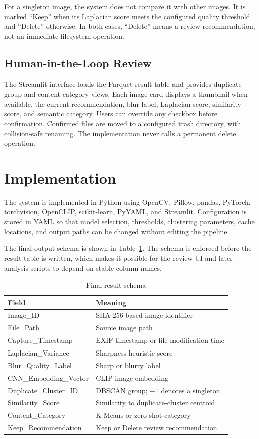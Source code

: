 \documentclass[conference]{IEEEtran}
\begin{document}
For a singleton image, the system does not compare it with other images. It is marked ``Keep'' when its Laplacian score meets the configured quality threshold and ``Delete'' otherwise. In both cases, ``Delete'' means a review recommendation, not an immediate filesystem operation.

\subsection{Human-in-the-Loop Review}
The Streamlit interface loads the Parquet result table and provides duplicate-group and content-category views. Each image card displays a thumbnail when available, the current recommendation, blur label, Laplacian score, similarity score, and semantic category. Users can override any checkbox before confirmation. Confirmed files are moved to a configured trash directory, with collision-safe renaming. The implementation never calls a permanent delete operation.

\section{Implementation}
The system is implemented in Python using OpenCV, Pillow, pandas, PyTorch, torchvision, OpenCLIP, scikit-learn, PyYAML, and Streamlit. Configuration is stored in YAML so that model selection, thresholds, clustering parameters, cache locations, and output paths can be changed without editing the pipeline.

The final output schema is shown in Table~\ref{tab:schema}. The schema is enforced before the result table is written, which makes it possible for the review UI and later analysis scripts to depend on stable column names.

\begin{table}[htbp]
\caption{Final result schema}
\label{tab:schema}
\centering
\begin{tabular}{p{} p{}}
\hline
\textbf{Field} & \textbf{Meaning} \\
\hline
Image\_ID & SHA-256-based image identifier \\
File\_Path & Source image path \\
Capture\_Timestamp & EXIF timestamp or file modification time \\
Laplacian\_Variance & Sharpness heuristic score \\
Blur\_Quality\_Label & Sharp or blurry label \\
CNN\_Embedding\_Vector & CLIP image embedding \\
Duplicate\_Cluster\_ID & DBSCAN group; $-1$ denotes a singleton \\
Similarity\_Score & Similarity to duplicate-cluster centroid \\
Content\_Category & K-Means or zero-shot category \\
Keep\_Recommendation & Keep or Delete review recommendation \\
\hline
\end{tabular}
\end{table}
\end{document}
